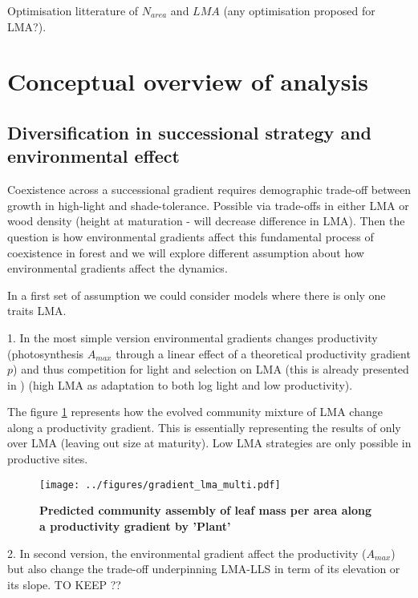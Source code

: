 \documentclass[a4paper,11pt]{article}
\begin{document}
Optimisation litterature of $N_{area}$ and $LMA$ (any optimisation proposed for LMA?).



\section{Conceptual overview of analysis}

\subsection{Diversification in successional strategy and environmental effect}

Coexistence across a successional gradient requires demographic trade-off between growth in high-light and shade-tolerance. Possible via trade-offs in either LMA or wood density (height at maturation - will decrease difference in LMA). Then the question is how environmental gradients affect this fundamental process of coexistence in forest and we will explore different assumption about how environmental gradients
affect the dynamics.

In a first set of assumption we could consider models where there is only one traits LMA.

\clearpage

1. In the most simple version environmental gradients changes productivity (photosynthesis $A_{max}$ through a linear effect of a theoretical productivity gradient $p$) and
thus competition for light and selection on LMA (this is already presented in \citet{Falster-2017}) (high LMA as adaptation to both log light and low productivity).

The figure \ref{fig:lma} represents how the evolved community mixture of LMA change along a productivity gradient. This is essentially representing the results of \citet{Falster-2017} only over LMA (leaving out size at maturity). Low LMA strategies are only possible in productive sites.

\begin{figure}[ht]
\centering
\texttt{[image: ../figures/gradient\_lma\_multi.pdf]}
\caption{\textbf{Predicted community assembly of leaf mass per area along a productivity gradient by 'Plant' \citep[see][]{Falster-2016}}
\label{fig:lma}}
\end{figure}

\clearpage

2. In second version, the environmental gradient affect the productivity ($A_{max}$) but also change the trade-off underpinning LMA-LLS in term of its elevation or its slope. TO KEEP ??
\end{document}
